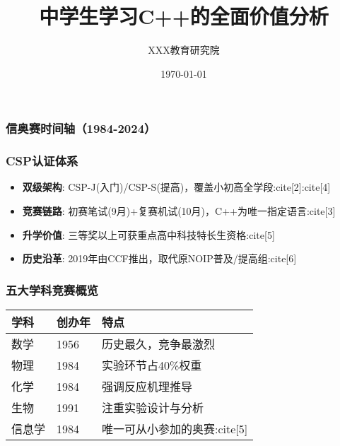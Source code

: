 \documentclass[aspectratio=169,UTF8]{beamer}
\title{中学生学习C++的全面价值分析}
\author{XXX教育研究院}
\date{\today}
\begin{document}
\begin{frame}
\frametitle{信奥赛时间轴（1984-2024）}
\end{frame}

\begin{frame}
\frametitle{CSP认证体系}
\begin{itemize}
    \item \textbf{双级架构}: CSP-J(入门)/CSP-S(提高)，覆盖小初高全学段:cite[2]:cite[4]
    \item \textbf{竞赛链路}: 初赛笔试(9月)+复赛机试(10月)，C++为唯一指定语言:cite[3]
    \item \textbf{升学价值}: 三等奖以上可获重点高中科技特长生资格:cite[5]
    \item \textbf{历史沿革}: 2019年由CCF推出，取代原NOIP普及/提高组:cite[6]
\end{itemize}
\end{frame}

\begin{frame}
\frametitle{五大学科竞赛概览}
\begin{tabular}{|l|l|l|}
    \hline
    \textbf{学科} & \textbf{创办年} & \textbf{特点} \\ \hline
    数学 & 1956 & 历史最久，竞争最激烈 \\ \hline
    物理 & 1984 & 实验环节占40\%权重 \\ \hline
    化学 & 1984 & 强调反应机理推导 \\ \hline
    生物 & 1991 & 注重实验设计与分析 \\ \hline
    信息学 & 1984 & 唯一可从小参加的奥赛:cite[5] \\ \hline
\end{tabular}
\end{frame}
\end{document}
